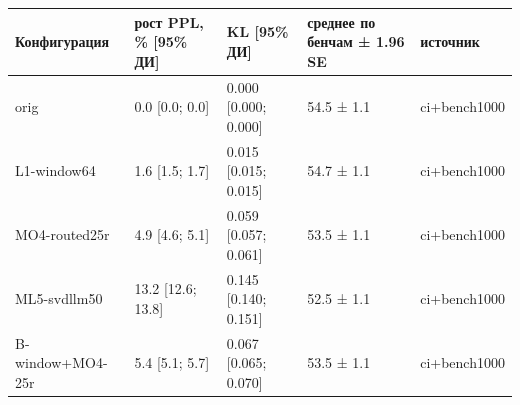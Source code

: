 \begin{tabular}{lllll}
\toprule
Конфигурация & рост PPL, \% [95\% ДИ] & KL [95\% ДИ] & среднее по бенчам ± 1.96 SE & источник \\
\midrule
orig & 0.0 [0.0; 0.0] & 0.000 [0.000; 0.000] & 54.5 ± 1.1 & ci+bench1000 \\
L1-window64 & 1.6 [1.5; 1.7] & 0.015 [0.015; 0.015] & 54.7 ± 1.1 & ci+bench1000 \\
MO4-routed25r & 4.9 [4.6; 5.1] & 0.059 [0.057; 0.061] & 53.5 ± 1.1 & ci+bench1000 \\
ML5-svdllm50 & 13.2 [12.6; 13.8] & 0.145 [0.140; 0.151] & 52.5 ± 1.1 & ci+bench1000 \\
B-window+MO4-25r & 5.4 [5.1; 5.7] & 0.067 [0.065; 0.070] & 53.5 ± 1.1 & ci+bench1000 \\
\bottomrule
\end{tabular}
